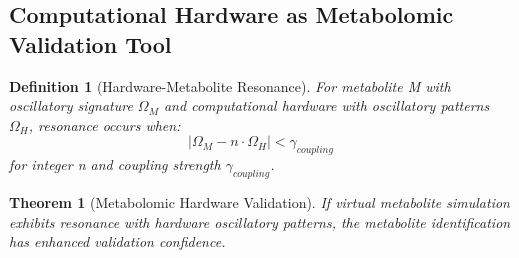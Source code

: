 \documentclass[12pt,a4paper]{article}
\newtheorem{theorem}{Theorem}
\newtheorem{definition}{Definition}
\begin{document}
\subsection{Computational Hardware as Metabolomic Validation Tool}

\begin{definition}[Hardware-Metabolite Resonance]
For metabolite M with oscillatory signature $\Omega_M$ and computational hardware with oscillatory patterns $\Omega_H$, resonance occurs when:
\begin{equation}
|\Omega_M - n \cdot \Omega_H| < \gamma_{coupling}
\end{equation}
for integer n and coupling strength $\gamma_{coupling}$.
\end{definition}

\begin{theorem}[Metabolomic Hardware Validation]
If virtual metabolite simulation exhibits resonance with hardware oscillatory patterns, the metabolite identification has enhanced validation confidence.
\end{theorem}
\end{document}
